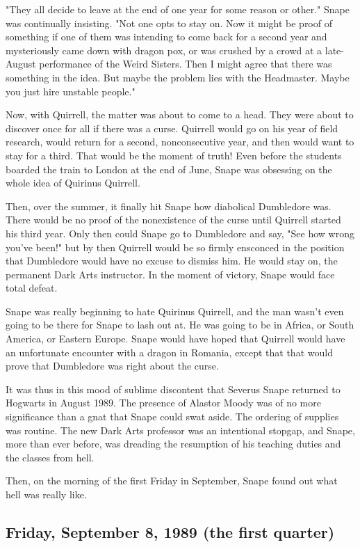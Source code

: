 "They all decide to leave at the end of one year for some reason or other." Snape was continually insisting. "Not one opts to stay on. Now it might be proof of something if one of them was intending to come back for a second year and mysteriously came down with dragon pox, or was crushed by a crowd at a late-August performance of the Weird Sisters. Then I might agree that there was something in the idea. But maybe the problem lies with the Headmaster. Maybe you just hire unstable people."

Now, with Quirrell, the matter was about to come to a head. They were about to discover once for all if there was a curse. Quirrell would go on his year of field research, would return for a second, nonconsecutive year, and then would want to stay for a third. That would be the moment of truth! Even before the students boarded the train to London at the end of June, Snape was obsessing on the whole idea of Quirinus Quirrell.

Then, over the summer, it finally hit Snape how diabolical Dumbledore was. There would be no proof of the nonexistence of the curse until Quirrell started his third year. Only then could Snape go to Dumbledore and say, "See how wrong you've been!" but by then Quirrell would be so firmly ensconced in the position that Dumbledore would have no excuse to dismiss him. He would stay on, the permanent Dark Arts instructor. In the moment of victory, Snape would face total defeat.

Snape was really beginning to hate Quirinus Quirrell, and the man wasn't even going to be there for Snape to lash out at. He was going to be in Africa, or South America, or Eastern Europe. Snape would have hoped that Quirrell would have an unfortunate encounter with a dragon in Romania, except that that would prove that Dumbledore was right about the curse.

It was thus in this mood of sublime discontent that Severus Snape returned to Hogwarts in August 1989. The presence of Alastor Moody was of no more significance than a gnat that Snape could swat aside. The ordering of supplies was routine. The new Dark Arts professor was an intentional stopgap, and Snape, more than ever before, was dreading the resumption of his teaching duties and the classes from hell.

Then, on the morning of the first Friday in September, Snape found out what hell was really like.

\subsection{Friday, September 8, 1989 (the first quarter)}

